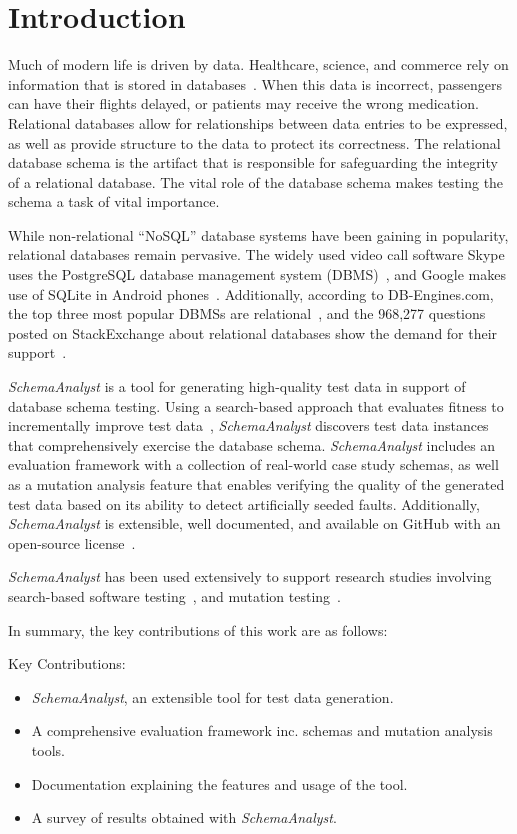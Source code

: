 \section{Introduction}

Much of modern life is driven by data.  Healthcare, science, and commerce rely on information that is
stored in databases~\cite{kapfhammer2007comprehensive}.  When this data is incorrect, passengers can have
their flights delayed, or patients may receive the wrong medication. 
Relational databases allow for relationships between data entries to be expressed, as well as provide structure to 
the data to protect its correctness. The relational database schema is the artifact
that is responsible for safeguarding the integrity of a relational database. The vital role of the database
schema makes testing the schema a task of vital importance.

While non-relational ``NoSQL'' database systems have been gaining in popularity, relational databases remain
pervasive. The widely used video call software Skype uses the PostgreSQL database management system
(DBMS)~\cite{https://www.postgresql.org/about/users/},
and Google makes use of SQLite in Android phones~\cite{https://www.sqlite.org/famous.html}.
Additionally, according to DB-Engines.com, the top three most popular DBMSs are 
relational~\cite{http://db-engines.com/en/ranking}, and the 968,277 questions posted on StackExchange 
about relational databases show the demand for their support~\cite{http://goo.gl/F3Tiax}.

\textit{SchemaAnalyst} is a tool for generating high-quality test data in support of database schema
testing. Using a search-based approach that evaluates fitness to incrementally improve test data~\cite{Korel:AVM},
\textit{SchemaAnalyst} discovers test data instances that comprehensively exercise the database schema.
\textit{SchemaAnalyst} includes an evaluation framework
with a collection of real-world case study schemas, as well as a mutation analysis feature
that enables verifying the quality of the generated test data based on its ability to detect artificially
seeded faults. Additionally, \textit{SchemaAnalyst}
is extensible, well documented, and available on GitHub with an open-source license~\cite{tool}.

\textit{SchemaAnalyst} has been used extensively to support research studies involving search-based
software testing~\cite{kapfhammer2013search,mcminn2015effectiveness,kinneer2015automatically}, and
mutation testing~\cite{wright2013efficient,wright2014impact,wright2015mutation}.

In summary, the key contributions of this work are as follows:

Key Contributions:
\begin{itemize}
\item \textit{SchemaAnalyst}, an extensible tool for test data generation.
\item A comprehensive evaluation framework inc. schemas and mutation analysis tools.
\item Documentation explaining the features and usage of the tool.
\item A survey of results obtained with \textit{SchemaAnalyst}.
\end{itemize}
